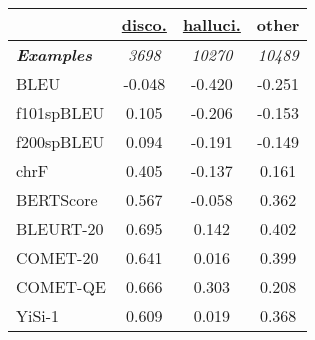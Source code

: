 \documentclass[11pt]{article}
\begin{document}
\begin{table}[t]
\centering
\small
\setlength{\tabcolsep}{5pt}
\setlength{\fboxsep}{0.5pt} \begin{tabular}{@{}lccc@{}}
\toprule
                    & \hyperref[sec:discourse]{\textbf{disco.}} & \hyperref[sec:hallucination]{\textbf{halluci.}} & \textbf{other}         \\ \midrule
\textit{\textbf{Examples}}          & \textit{3698}   & \textit{10270} & \textit{10489} \\ \midrule
BLEU                    & -0.048                                         & -0.420                                             & -0.251                                     \\
f101spBLEU              & \phantom{-}0.105                                          & -0.206                                             & -0.153                                     \\
f200spBLEU              & \phantom{-}0.094                                          & -0.191                                             & -0.149                                     \\
chrF                    & \phantom{-}0.405                                          & -0.137                                             & \phantom{-}0.161                                      \\
BERTScore               & \phantom{-}0.567                                          & -0.058                                             & \phantom{-}0.362                                      \\
BLEURT-20               & \phantom{-}0.695                                          & \phantom{-}0.142                                              & \phantom{-}0.402                                      \\
COMET-20                & \phantom{-}0.641                                          & \phantom{-}0.016                                              & \phantom{-}0.399                                      \\
COMET-QE                & \phantom{-}0.666                                          & \phantom{-}0.303                                              & \phantom{-}0.208                                      \\
YiSi-1                  & \phantom{-}0.609                                          & \phantom{-}0.019                                              & \phantom{-}0.368                                      \\

\end{tabular}
\end{table}
\end{document}

